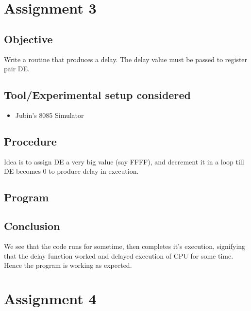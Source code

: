 \documentclass[a4paper]{article} %
\begin{document}
\section[Delay Procedure]{Assignment 3} %
    \subsection{Objective}
        Write a routine that produces a delay. The delay value must be passed to register pair DE.
    \subsection{Tool/Experimental setup considered}
        \begin{itemize}
            \item Jubin's 8085 Simulator
        \end{itemize}
    \subsection{Procedure}
        Idea is to assign DE a very big value (say FFFF), and decrement it in a loop till DE becomes 0 to produce delay in execution.
    \subsection{Program}
        
    \subsection{Conclusion}
        We see that the code runs for sometime, then completes it's execution, signifying that the delay function worked and delayed execution of CPU for some time.\\
        Hence the program is working as expected.
\newpage

\section[Move block of data from location X to location Y]{Assignment 4} %
\end{document}

